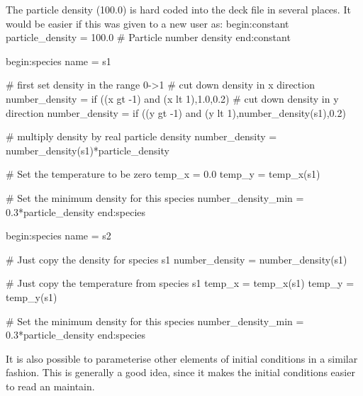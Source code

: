 \documentclass[12pt,a4paper]{article}
\newenvironment{boxverbatim}{\lboxverbatim{none}}{\endlboxverbatim}
\begin{document}
The particle density (100.0) is hard coded into the deck file in several
places. It would be easier if this was given to a new user as:
\begin{boxverbatim}
begin:constant
   particle_density = 100.0 # Particle number density
end:constant

begin:species
   name = s1

   # first set density in the range 0->1
   # cut down density in x direction
   number_density = if ((x gt -1) and (x lt 1),1.0,0.2)
   # cut down density in y direction
   number_density = if ((y gt -1) and (y lt 1),number_density(s1),0.2)

   # multiply density by real particle density
   number_density = number_density(s1)*particle_density

   # Set the temperature to be zero
   temp_x = 0.0
   temp_y = temp_x(s1)

   # Set the minimum density for this species
   number_density_min = 0.3*particle_density
end:species

begin:species
   name = s2

   # Just copy the density for species s1
   number_density = number_density(s1)

   # Just copy the temperature from species s1
   temp_x = temp_x(s1)
   temp_y = temp_y(s1)

   # Set the minimum density for this species
   number_density_min = 0.3*particle_density
end:species
\end{boxverbatim}

It is also possible to parameterise other elements of initial conditions in a
similar fashion. This is generally a good idea, since it makes the
initial conditions easier to read an maintain.
\end{document}
